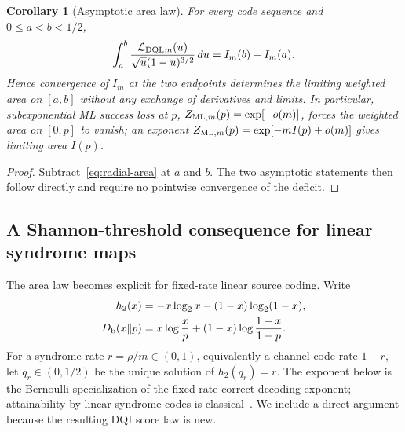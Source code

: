 \documentclass[journal]{IEEEtran}
\newtheorem{corollary}[theorem]{Corollary}
\theoremstyle{definition}
\theoremstyle{remark}
\begin{document}
\begin{corollary}[Asymptotic area law]
\label{cor:asymptotic-area}
For every code sequence and $0\le a<b<1/2$,
\begin{equation}
 \int_a^b\frac{\mathcal L_{{\rm DQI},m}(u)}
 {\sqrt u(1-u)^{3/2}}\,du=I_m(b)-I_m(a).
 \label{eq:interval-area}
\end{equation}
Hence convergence of $I_m$ at the two endpoints determines the limiting
weighted area on $[a,b]$ without any exchange of derivatives and limits.  In
particular, subexponential ML success loss at $p$,
$Z_{{\rm ML},m}(p)=\exp[-o(m)]$, forces the weighted area on $[0,p]$ to vanish;
an exponent $Z_{{\rm ML},m}(p)=\exp[-mI(p)+o(m)]$ gives limiting area $I(p)$.
\end{corollary}

\begin{proof}
Subtract~\eqref{eq:radial-area} at $a$ and $b$.  The two asymptotic statements
then follow directly and require no pointwise convergence of the deficit.
\end{proof}

\subsection{A Shannon-threshold consequence for linear syndrome maps}

The area law becomes explicit for fixed-rate linear source coding.  Write
\begin{align}
 h_2(x)&=-x\log_2x-(1-x)\log_2(1-x),\\
 D_{\rm b}(x\Vert p)&=x\log\frac{x}{p}
 +(1-x)\log\frac{1-x}{1-p}.
 \label{eq:binary-entropy-divergence}
\end{align}
For a syndrome rate $r=\rho/m\in(0,1)$, equivalently a channel-code rate
$1-r$, let $q_r\in(0,1/2)$ be the unique solution
of $h_2(q_r)=r$.  The exponent below is the Bernoulli specialization of the
fixed-rate correct-decoding exponent; attainability by linear syndrome codes
is classical~\cite{chen2009duality}.  We include a direct argument because the
resulting DQI score law is new.
\end{document}
